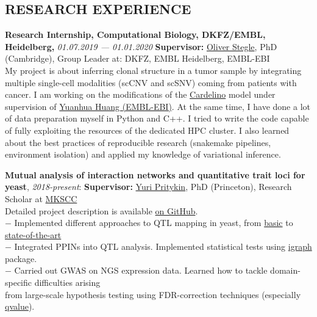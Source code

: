 \documentclass[11pt]{res}
\newcommand{\vmarginsmall}{\vspace{0.1cm}}
\begin{document}
\begin{resume}
\section{RESEARCH EXPERIENCE}
\vmarginsmall
\par 
\textbf{Research Internship, Computational Biology, DKFZ/EMBL, Heidelberg,} \textit{01.07.2019 — 01.01.2020}
\textbf{Supervisor:} \href{https://scholar.google.com/citations?user=ClSXZ4IAAAAJ&hl=en}{Oliver Stegle}, PhD (Cambridge), Group Leader at: DKFZ, EMBL Heidelberg, EMBL-EBI\\
My project is about inferring clonal structure in a tumor sample by integrating multiple single-cell modalities (scCNV and scSNV) coming from patients with cancer. I am working on the modifications of the \href{https://github.com/PMBio/cardelino}{Cardelino} model under supervision of \href{https://www.ebi.ac.uk/about/people/yuanhua-huang}{Yuanhua Huang (EMBL-EBI)}. At the same time, I have done a lot of data preparation myself in Python and C++. I tried to write the code capable of fully exploiting the resources of the dedicated HPC cluster. I also learned about the best practices of reproducible research (snakemake pipelines, environment isolation) and applied my knowledge of variational inference. 
\par 
\textbf{Mutual analysis of interaction networks and quantitative trait loci for yeast}, \textit{2018-present}:
\textbf{Supervisor:} \href{https://scholar.google.com/citations?hl=en&user=Arx56RkJBrYC&view_op=list_works&sortby=pubdate}{Yuri Pritykin}, PhD (Princeton), Research Scholar at \href{https://www.mskcc.org/}{MKSCC}\\
Detailed project description is available \href{https://github.com/ivanov-v-v/eQTL_analysis}{on GitHub}.\vspace{0.2em}\\
$ - $ Implemented different approaches to QTL mapping in yeast, from \href{https://www.ncbi.nlm.nih.gov/pubmed/11923494}{basic} to \href{https://elifesciences.org/articles/35471}{state-of-the-art}\\
$ - $ Integrated PPINs into QTL analysis. Implemented statistical tests using \href{http://igraph.org/redirect.html}{igraph} package.\\
$ - $ Carried out GWAS on NGS expression data. Learned how to tackle domain-specific difficulties arising\\ \hphantom{—} from large-scale hypothesis testing using FDR-correction techniques (especially \href{https://github.com/StoreyLab/qvalue}{qvalue}).\\

\end{resume}
\end{document}
